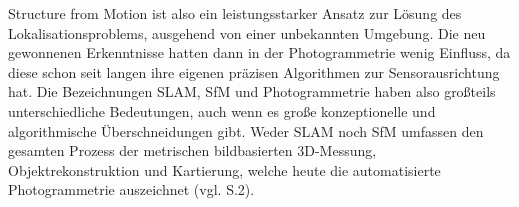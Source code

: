Structure from Motion ist also ein leistungsstarker Ansatz zur Lösung des Lokalisationsproblems, ausgehend von einer unbekannten Umgebung. Die neu gewonnenen Erkenntnisse hatten dann in der Photogrammetrie wenig Einfluss, da diese schon seit langen ihre eigenen präzisen Algorithmen zur Sensorausrichtung hat. Die Bezeichnungen SLAM, SfM und Photogrammetrie haben also großteils unterschiedliche Bedeutungen, auch wenn es große konzeptionelle und algorithmische Überschneidungen gibt. Weder SLAM noch SfM umfassen den gesamten Prozess der metrischen bildbasierten 3D-Messung, Objektrekonstruktion und Kartierung, welche heute die automatisierte Photogrammetrie auszeichnet (vgl. \cite{vergleich_fraser} S.2).


